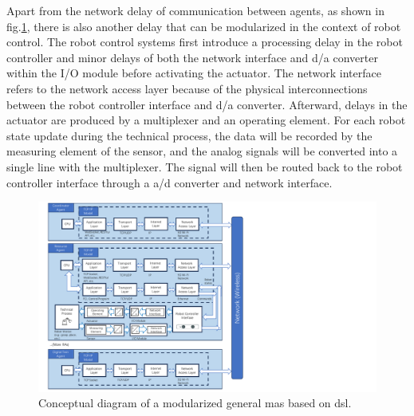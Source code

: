 Apart from the network delay of communication between 
agents, as shown in fig.\ref{fig: DSLConceptual}, there is also another 
delay that can be modularized in 
the context of robot control. The robot control systems first introduce a processing 
delay in the robot controller and minor delays of both the network interface and 
\gls{d/a} converter within the I/O module before activating 
the actuator. The network interface refers to the network access layer because of 
the physical interconnections between the robot controller interface and \gls{d/a} converter. 
Afterward, delays in the actuator are produced by a multiplexer and an operating element. 
For each robot state update during the technical process, the data will be recorded 
by the measuring element of the sensor, and the analog signals will be 
converted into a single line with the multiplexer. The signal will then be routed 
back to the robot controller interface through a \gls{a/d} converter and network interface. 








\begin{figure}[htb]
    \centering
    \includegraphics[width=\textwidth]{figures/DSLConceptual.pdf}
    \caption{Conceptual diagram of a modularized general \gls{mas} based on \gls{dsl}. \label{fig: DSLConceptual}}
\end{figure}
        